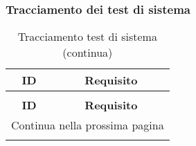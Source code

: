\subsubsection{Tracciamento dei test di sistema}

\bgroup
\begin{adjustwidth}{-0.5cm}{-0.5cm}
	\centering
  \begin{longtable}{|c|c|}
		\caption{Tracciamento test di sistema}
  	\label{tab:tracciamento-test-sistema} \\
    \hline
		\textbf{ID} & \textbf{Requisito} \\ 
		\hline
		\endfirsthead

		\caption[]{Tracciamento test di sistema (continua)} \\
		\hline
		\textbf{ID} & \textbf{Requisito} \\ 
		\hline
		\endhead

		\hline
		\multicolumn{2}{|r|}{{Continua nella prossima pagina}} \\ 
		\hline
		\endfoot

		\hline
		\endlastfoot


\end{longtable}
\end{adjustwidth}
